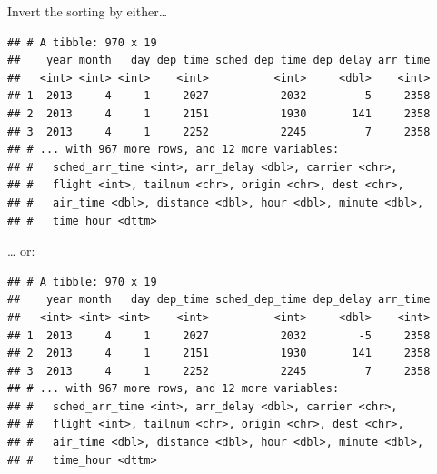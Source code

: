 \documentclass[]{book}
\newenvironment{Shaded}{}{}
\newcommand{\DecValTok}[1]{#1}
\newcommand{\KeywordTok}[1]{\textcolor[rgb]{0.00,0.00,1.00}{#1}}
\newcommand{\NormalTok}[1]{#1}
\newcommand{\OperatorTok}[1]{#1}
\newcommand{\StringTok}[1]{\textcolor[rgb]{0.00,0.50,0.50}{#1}}
\begin{document}
Invert the sorting by either\ldots{}

\begin{Shaded}
\end{Shaded}

\begin{verbatim}
## # A tibble: 970 x 19
##    year month   day dep_time sched_dep_time dep_delay arr_time
##   <int> <int> <int>    <int>          <int>     <dbl>    <int>
## 1  2013     4     1     2027           2032        -5     2358
## 2  2013     4     1     2151           1930       141     2358
## 3  2013     4     1     2252           2245         7     2358
## # ... with 967 more rows, and 12 more variables:
## #   sched_arr_time <int>, arr_delay <dbl>, carrier <chr>,
## #   flight <int>, tailnum <chr>, origin <chr>, dest <chr>,
## #   air_time <dbl>, distance <dbl>, hour <dbl>, minute <dbl>,
## #   time_hour <dttm>
\end{verbatim}

\ldots{} or:

\begin{Shaded}
\end{Shaded}

\begin{verbatim}
## # A tibble: 970 x 19
##    year month   day dep_time sched_dep_time dep_delay arr_time
##   <int> <int> <int>    <int>          <int>     <dbl>    <int>
## 1  2013     4     1     2027           2032        -5     2358
## 2  2013     4     1     2151           1930       141     2358
## 3  2013     4     1     2252           2245         7     2358
## # ... with 967 more rows, and 12 more variables:
## #   sched_arr_time <int>, arr_delay <dbl>, carrier <chr>,
## #   flight <int>, tailnum <chr>, origin <chr>, dest <chr>,
## #   air_time <dbl>, distance <dbl>, hour <dbl>, minute <dbl>,
## #   time_hour <dttm>
\end{verbatim}
\end{document}
